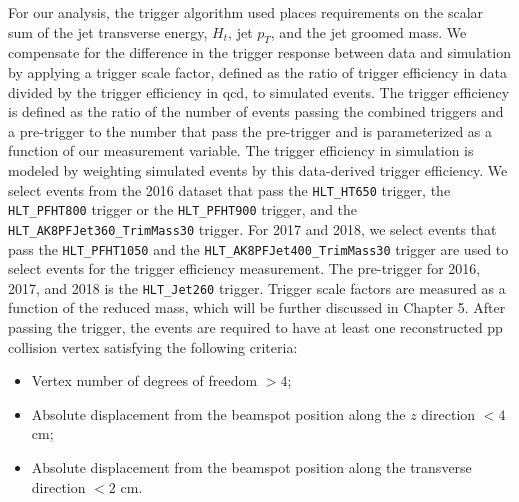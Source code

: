 For our analysis, the trigger algorithm used places requirements on the scalar sum of the jet transverse energy, $H_t$, jet $p_T$, and the jet groomed mass. 
We compensate for the difference in the trigger response between data and simulation by applying a trigger scale factor, defined as the ratio of trigger efficiency in data divided by the trigger efficiency in qcd, to simulated events. 
The trigger efficiency is defined as the ratio of the number of events passing the combined triggers and a pre-trigger to the number that pass the pre-trigger and is parameterized as a function of our measurement variable. 
The trigger efficiency in simulation is modeled by weighting simulated events by this data-derived trigger efficiency. 
We select events from the 2016 dataset that pass the \texttt{HLT\_HT650} trigger, the \texttt{HLT\_PFHT800} trigger or the \texttt{HLT\_PFHT900} trigger, and the \texttt{HLT\_AK8PFJet360\_TrimMass30} trigger. 
For 2017 and 2018, we select events that pass the \texttt{HLT\_PFHT1050} and the \texttt{HLT\_AK8PFJet400\_TrimMass30} trigger are used to select events for the trigger efficiency measurement. 
The pre-trigger for 2016, 2017, and 2018 is the \texttt{HLT\_Jet260} trigger.
Trigger scale factors are measured as a function of the reduced mass, which will be further discussed in Chapter 5. 
After passing the trigger, the events are required to have at least one reconstructed pp collision vertex satisfying the following criteria:
\begin{itemize}{}
\item Vertex number of degrees of freedom $> 4$;
\item Absolute displacement from the beamspot position along the $z$ direction $< 4$ cm;
\item Absolute displacement from the beamspot position along the transverse direction $< 2$ cm.
\end{itemize}

